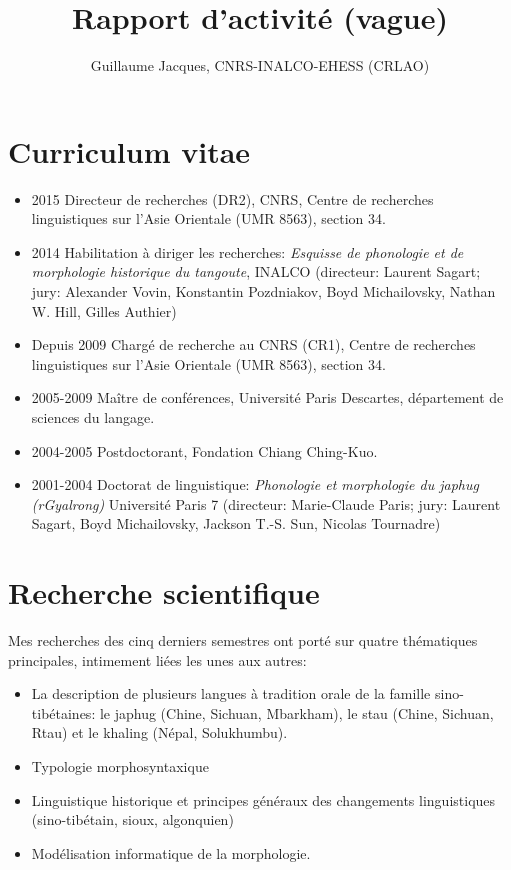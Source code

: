 \documentclass[oldfontcommands,oneside,a4paper,11pt]{article}
\begin{document}
  \title{Rapport d'activité (vague)}
 
\author{Guillaume Jacques, CNRS-INALCO-EHESS (CRLAO)}
\maketitle
\sloppy


\section{Curriculum vitae}
\begin{itemize}
\item 2015 Directeur de recherches (DR2), CNRS, Centre de recherches linguistiques sur l'Asie Orientale (UMR 8563), section 34.
\item 2014 Habilitation à diriger les recherches: \textit{Esquisse de phonologie et de morphologie historique du tangoute}, INALCO  (directeur: Laurent Sagart; jury: Alexander Vovin, Konstantin Pozdniakov, Boyd Michailovsky, Nathan W. Hill, Gilles Authier)
\item Depuis 2009 Chargé de recherche au CNRS (CR1), Centre de recherches linguistiques sur l'Asie Orientale (UMR 8563), section 34.
\item 2005-2009 Maître de conférences, Université Paris Descartes, département de sciences du langage.
\item 2004-2005 Postdoctorant, Fondation Chiang Ching-Kuo.
\item 2001-2004 Doctorat de linguistique: \textit{Phonologie et morphologie du japhug (rGyalrong)} Université Paris 7 (directeur: Marie-Claude Paris; jury: Laurent Sagart, Boyd Michailovsky, Jackson T.-S. Sun, Nicolas Tournadre)
\end{itemize}
\section{Recherche scientifique}

Mes recherches des cinq derniers semestres ont porté sur quatre thématiques principales, intimement liées les unes aux autres:

\begin{itemize}
\item La description de plusieurs langues à tradition orale de la famille sino-tibétaines: le japhug (Chine, Sichuan, Mbarkham), le stau (Chine, Sichuan, Rtau) et le khaling (Népal, Solukhumbu). 
\item Typologie morphosyntaxique
\item Linguistique historique et principes généraux des changements linguistiques (sino-tibétain, sioux, algonquien)
\item Modélisation informatique de la morphologie.
\end{itemize}
\end{document}
